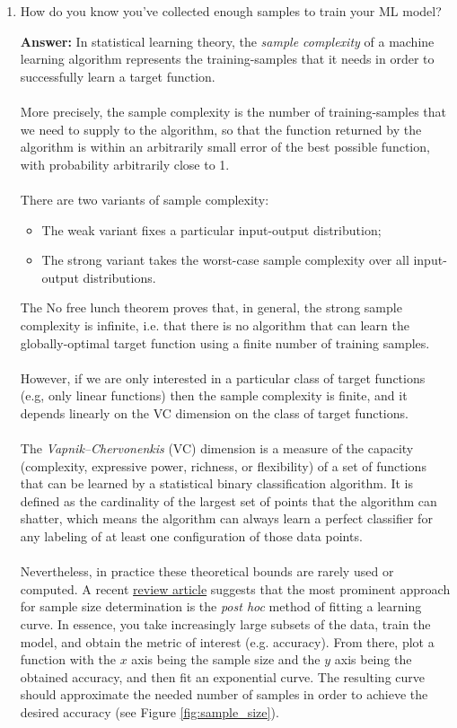 \documentclass{article}
\newenvironment{QandA}{\begin{enumerate}[label=\arabic*.]}{\end{enumerate}}
\newenvironment{answer}{\par\normalfont \textbf{Answer:}}{}
\begin{document}
\begin{QandA}
    \item How do you know you’ve collected enough samples to train your ML model?
    \begin{answer}
        In statistical learning theory, the \textit{sample complexity} of a machine learning algorithm represents the training-samples that it needs in order to successfully learn a target function. \\\\
        More precisely, the sample complexity is the number of training-samples that we need to supply to the algorithm, so that the function returned by the algorithm is within an arbitrarily small error of the best possible function, with probability arbitrarily close to 1. \\\\
        There are two variants of sample complexity:
        \begin{itemize}
            \item The weak variant fixes a particular input-output distribution;
            \item The strong variant takes the worst-case sample complexity over all input-output distributions.
        \end{itemize}
        The No free lunch theorem proves that, in general, the strong sample complexity is infinite, i.e. that there is no algorithm that can learn the globally-optimal target function using a finite number of training samples. \\\\
        However, if we are only interested in a particular class of target functions (e.g, only linear functions) then the sample complexity is finite, and it depends linearly on the VC dimension on the class of target functions. \\\\
        The \textit{Vapnik–Chervonenkis} (VC) dimension is a measure of the capacity (complexity, expressive power, richness, or flexibility) of a set of functions that can be learned by a statistical binary classification algorithm. It is defined as the cardinality of the largest set of points that the algorithm can shatter, which means the algorithm can always learn a perfect classifier for any labeling of at least one configuration of those data points. \\\\
        Nevertheless, in practice these theoretical bounds are rarely used or computed. A recent \href{https://www.researchgate.net/publication/335779941_Sample-Size_Determination_Methodologies_for_Machine_Learning_in_Medical_Imaging_Research_A_Systematic_Review}{review article} suggests that the most prominent approach for sample size determination is the \textit{post hoc} method of fitting a learning curve. In essence, you take increasingly large subsets of the data, train the model, and obtain the metric of interest (e.g. accuracy). From there, plot a function with the $x$ axis being the sample size and the $y$ axis being the obtained accuracy, and then fit an exponential curve. The resulting curve should approximate the needed number of samples in order to achieve the desired accuracy (see Figure \ref{fig:sample_size}).


\end{answer}
\end{QandA}
\end{document}
